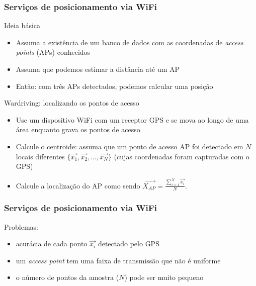 \documentclass[Ligatures=TeX,table,brazil,svgnames,usetotalslideindicator,compress,10pt]{beamer}
\begin{document}
\begin{frame}
  \frametitle{Serviços de posicionamento via WiFi}
  \begin{block}{Ideia básica}
    \begin{itemize}
    \item Assuma a existência de um banco de dados com as coordenadas de \textit{access points} (APs) conhecidos
    \item Assuma que podemos estimar a distância até um AP
    \item Então: com três APs detectados, podemos calcular uma posição
    \end{itemize}
  \end{block}
  \begin{block}{Wardriving: localizando os pontos de acesso}
    \begin{itemize}
    \item Use um dispositivo WiFi com um receptor GPS e se mova ao longo de uma área enquanto grava os pontos de acesso
    \item Calcule o centroide: assuma que um ponto de acesso AP foi detectado em $N$ locais diferentes $\{\vec{x_1}, \vec{x_2}, \ldots, \vec{x_N}  \}$ (cujas coordenadas foram capturadas com o GPS)
    \item Calcule a localização do AP como sendo $\vec{X_{AP}} = \frac{\sum_{i=1}^{N} \vec{x_i}}{N}$.
    \end{itemize}
  \end{block}
\end{frame}

\begin{frame}
  \frametitle{Serviços de posicionamento via WiFi}
  \begin{block}{Problemas:}
    \begin{itemize}
    \item acurácia de cada ponto $\vec{x_i}$ detectado pelo GPS
    \item um \textit{access point} tem uma faixa de transmissão que não é uniforme
    \item o número de pontos da amostra ($N$) pode ser muito pequeno
    \end{itemize}
  \end{block}
\end{frame}

\end{document}
